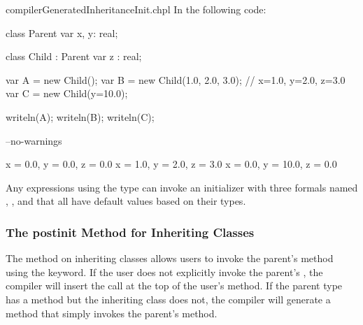 \begin{chapelexample}{compilerGeneratedInheritanceInit.chpl}
In the following code:
\begin{chapel}
class Parent {
  var x, y: real;
}

class Child : Parent {
  var z : real;
}

var A = new Child();
var B = new Child(1.0, 2.0, 3.0); // x=1.0, y=2.0, z=3.0
var C = new Child(y=10.0);
\end{chapel}
\begin{chapelpost}
writeln(A);
writeln(B);
writeln(C);
\end{chapelpost}
\begin{chapelcompopts}
--no-warnings
\end{chapelcompopts}
\begin{chapeloutput}
{x = 0.0, y = 0.0, z = 0.0}
{x = 1.0, y = 2.0, z = 3.0}
{x = 0.0, y = 10.0, z = 0.0}
\end{chapeloutput}
Any  expressions using the  type can invoke an
initializer with three formals named , , and  that all
have default values based on their types.
\end{chapelexample}

\subsubsection{The postinit Method for Inheriting Classes}
\label{The_postinit_Method_for_Inheriting_Classes}

The  method on inheriting classes allows users to invoke
the parent's  method using the  keyword. If the
user does not explicitly invoke the parent's , the compiler
will insert the call at the top of the user's  method. If the
parent type has a  method but the inheriting class does not,
the compiler will generate a  method that simply invokes the
parent's  method.

